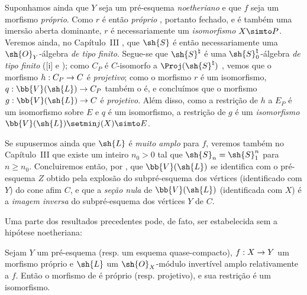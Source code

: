 \documentclass[oneside,10pt]{amsart}
\makeatletter
\renewcommand{\geq}{\geqslant}
\newcommand{\ega@arrow}[2]{\mathchoice{#1}{#2}{#2}{#2}}
\renewcommand{\to}{\ega@arrow{\longrightarrow}{\rightarrow}}
\let\EGAOriginalLabel\label
\renewcommand{\label}[1]{\phantomsection\EGAOriginalLabel{#1}}
\makeatother
\begin{document}
\begin{remark}[8.8.3]
\label{II.8.8.3}
Suponhamos ainda que $Y$ seja um pré-esquema \emph{noetheriano} e que $f$ seja um morfismo \emph{próprio}.
Como $r$ é então \emph{próprio} , portanto fechado, e é também uma imersão aberta dominante, $r$ é necessariamente um \emph{isomorfismo} $X\simto P$.
Veremos ainda, no Capítulo~III , que $\sh{S}$ é então necessariamente uma $\sh{O}_Y$-álgebra \emph{de tipo finito}.
Segue-se que $\sh{S}^\natural$ é uma $\sh{S}_0^\natural$-álgebra \emph{de tipo finito} ([i] e );
como $C_P$ é $C$-isomorfo a $\Proj(\sh{S}^\natural)$ , vemos que o morfismo $h:C_P\to C$ é \emph{projetivo};
como o morfismo $r$ é um isomorfismo, $q:\bb{V}(\sh{L})\to C_P$ também o é, e concluímos que o morfismo $g:\bb{V}(\sh{L})\to C$ é \emph{projetivo}.
Além disso, como a restrição de $h$ a $E_P$ é um isomorfismo sobre $E$ e $q$ é um isomorfismo, a restrição  de $g$ é um \emph{isomorfismo} $\bb{V}(\sh{L})\setmin j(X)\simto E$.

Se supusermos ainda que $\sh{L}$ é \emph{muito amplo} para $f$, veremos também no Capítulo~III  que existe um inteiro $n_0>0$ tal que $\sh{S}_n=\sh{S}_1^n$ para $n\geq n_0$.
Concluiremos então, por , que $\bb{V}(\sh{L})$ se identifica com o pré-esquema $Z$ obtido pela explosão do subpré-esquema dos vértices (identificado com $Y$) do cone afim $C$,
e que a \emph{seção nula} de $\bb{V}(\sh{L})$ (identificada com $X$) é a \emph{imagem inversa} do subpré-esquema dos vértices $Y$ de $C$.

Uma parte dos resultados precedentes pode, de fato, ser estabelecida sem a hipótese noetheriana:
\end{remark}
\begin{corollary}[8.8.4]
\label{II.8.8.4}
Sejam $Y$ um pré-esquema (resp. um esquema quase-compacto), $f:X\to Y$ um morfismo próprio e $\sh{L}$ um $\sh{O}_X$-módulo invertível amplo relativamente a $f$.
Então o morfismo de  é próprio (resp. projetivo), e sua restrição  é um isomorfismo.
\end{corollary}
\end{document}

